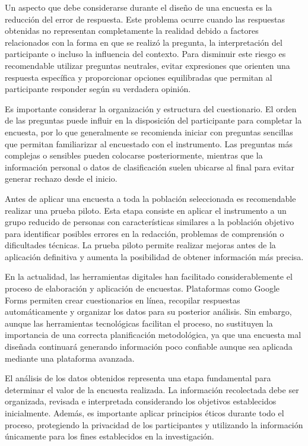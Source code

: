 \documentclass[12pt,letterpaper]{article}
\begin{document}
Un aspecto que debe considerarse durante el diseño de una encuesta es la reducción del error de respuesta. Este problema ocurre cuando las respuestas obtenidas no representan completamente la realidad debido a factores relacionados con la forma en que se realizó la pregunta, la interpretación del participante o incluso la influencia del contexto. Para disminuir este riesgo es recomendable utilizar preguntas neutrales, evitar expresiones que orienten una respuesta específica y proporcionar opciones equilibradas que permitan al participante responder según su verdadera opinión.

Es importante considerar la organización y estructura del cuestionario. El orden de las preguntas puede influir en la disposición del participante para completar la encuesta, por lo que generalmente se recomienda iniciar con preguntas sencillas que permitan familiarizar al encuestado con el instrumento. Las preguntas más complejas o sensibles pueden colocarse posteriormente, mientras que la información personal o datos de clasificación suelen ubicarse al final para evitar generar rechazo desde el inicio.

Antes de aplicar una encuesta a toda la población seleccionada es recomendable realizar una prueba piloto. Esta etapa consiste en aplicar el instrumento a un grupo reducido de personas con características similares a la población objetivo para identificar posibles errores en la redacción, problemas de comprensión o dificultades técnicas. La prueba piloto permite realizar mejoras antes de la aplicación definitiva y aumenta la posibilidad de obtener información más precisa.

En la actualidad, las herramientas digitales han facilitado considerablemente el proceso de elaboración y aplicación de encuestas. Plataformas como Google Forms permiten crear cuestionarios en línea, recopilar respuestas automáticamente y organizar los datos para su posterior análisis. Sin embargo, aunque las herramientas tecnológicas facilitan el proceso, no sustituyen la importancia de una correcta planificación metodológica, ya que una encuesta mal diseñada continuará generando información poco confiable aunque sea aplicada mediante una plataforma avanzada.

El análisis de los datos obtenidos representa una etapa fundamental para determinar el valor de la encuesta realizada. La información recolectada debe ser organizada, revisada e interpretada considerando los objetivos establecidos inicialmente. Además, es importante aplicar principios éticos durante todo el proceso, protegiendo la privacidad de los participantes y utilizando la información únicamente para los fines establecidos en la investigación.
\vspace{1em}
\end{document}
